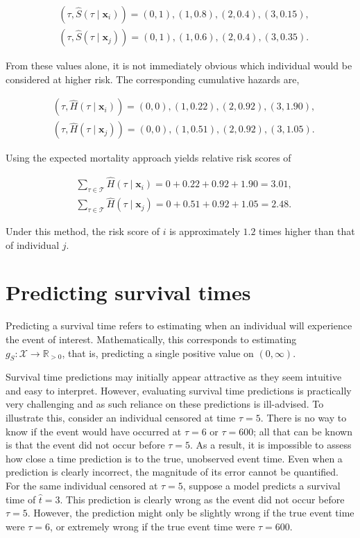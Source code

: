 \documentclass[
  letterpaper,
  krantz2]{style/krantz}
\begin{document}
\[
\begin{aligned}
&(\tau, \hat{S}(\tau \mid \mathbf{x}_i)) = (0, 1), (1, 0.8), (2, 0.4), (3, 0.15), \\
&(\tau, \hat{S}(\tau \mid \mathbf{x}_j)) = (0, 1), (1, 0.6), (2, 0.4), (3, 0.35).
\end{aligned}
\]

From these values alone, it is not immediately obvious which individual
would be considered at higher risk. The corresponding cumulative hazards
are,

\[
\begin{aligned}
&(\tau, \hat{H}(\tau \mid \mathbf{x}_i)) = (0, 0), (1, 0.22), (2, 0.92), (3, 1.90), \\
&(\tau, \hat{H}(\tau \mid \mathbf{x}_j)) = (0, 0), (1, 0.51), (2, 0.92), (3, 1.05).
\end{aligned}
\]

Using the expected mortality approach yields relative risk scores of

\[
\begin{aligned}
&\sum_{\tau \in \mathcal{T}} \hat{H}(\tau \mid \mathbf{x}_i) = 0 + 0.22 + 0.92 + 1.90 = 3.01, \\
&\sum_{\tau \in \mathcal{T}} \hat{H}(\tau \mid \mathbf{x}_j) = 0 + 0.51 + 0.92 + 1.05 = 2.48.
\end{aligned}
\]

Under this method, the risk score of \(i\) is approximately \(1.2\)
times higher than that of individual \(j\).

\section{Predicting survival times}\label{sec-survtsk-time}

Predicting a survival time refers to estimating
when an individual will experience the event of interest.
Mathematically, this corresponds to estimating
\(g_S: \mathcal{X}\rightarrow \mathbb{R}_{>0}\), that is, predicting a
single positive value on \((0,\infty)\).

Survival time predictions may initially appear attractive as they seem
intuitive and easy to interpret. However, evaluating survival time
predictions is practically very challenging and as such reliance on
these predictions is ill-advised. To illustrate this, consider an
individual censored at time \(\tau=5\). There is no way to know if the
event would have occurred at \(\tau=6\) or \(\tau=600\); all that can be
known is that the event did not occur before \(\tau=5\). As a result, it
is impossible to assess how close a time prediction is to the true,
unobserved event time. Even when a prediction is clearly incorrect, the
magnitude of its error cannot be quantified. For the same individual
censored at \(\tau=5\), suppose a model predicts a survival time of
\(\hat{t}=3\). This prediction is clearly wrong as the event did not
occur before \(\tau=5\). However, the prediction might only be slightly
wrong if the true event time were \(\tau=6\), or extremely wrong if the
true event time were \(\tau=600\).
\end{document}
